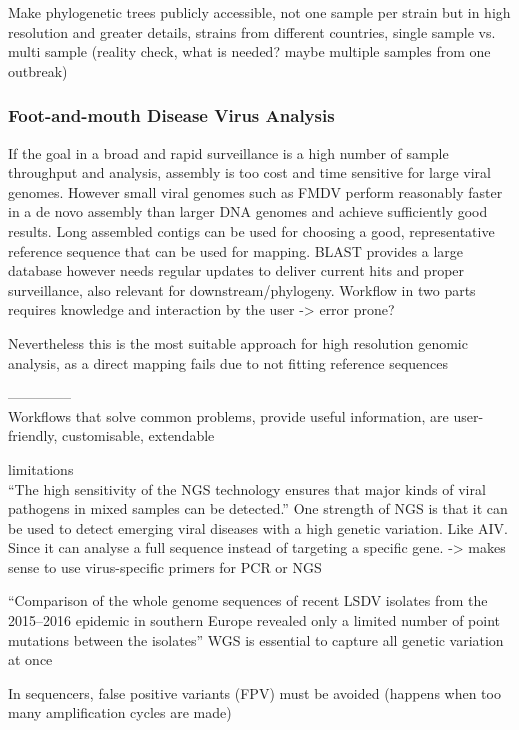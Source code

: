 Make phylogenetic trees publicly accessible, not one sample per strain but in high resolution and greater details, strains from different countries,
single sample vs. multi sample (reality check, what is needed? maybe multiple samples from one outbreak) 


\subsubsection*{Foot-and-mouth Disease Virus Analysis}
If the goal in a broad and rapid surveillance is a high number of sample throughput and analysis, assembly is too cost and time sensitive for large viral genomes. However small viral genomes such as FMDV perform reasonably faster in a de novo assembly than larger DNA genomes and achieve sufficiently good results. Long assembled contigs can be used for choosing a good, representative reference sequence that can be used for mapping. BLAST provides a large database however needs regular updates to deliver current hits and proper surveillance, also relevant for downstream/phylogeny.
Workflow in two parts requires knowledge and interaction by the user -> error prone?

Nevertheless this is the most suitable approach for high resolution genomic analysis, as a direct mapping fails due to not fitting reference sequences

--------------\\
Workflows that solve common problems, provide useful information, are user-friendly, customisable, extendable

limitations \\

``The high sensitivity of the \ac{NGS} technology ensures that major kinds of viral pathogens in mixed samples can be detected.''
One strength of \ac{NGS} is that it can be used to detect emerging viral diseases with a high genetic variation. Like \ac{AIV}. Since it can analyse a full sequence instead of targeting a specific gene. -> makes sense to use virus-specific primers for \ac{PCR} or \ac{NGS} 

``Comparison of the whole genome sequences of recent \ac{LSDV} isolates from the 2015–2016 epidemic in southern Europe revealed only a limited number of point mutations between the isolates'' \ac{WGS} is essential to capture all genetic variation at once

In sequencers, false positive variants (\ac{FPV}) must be avoided (happens when too many amplification cycles are made)

